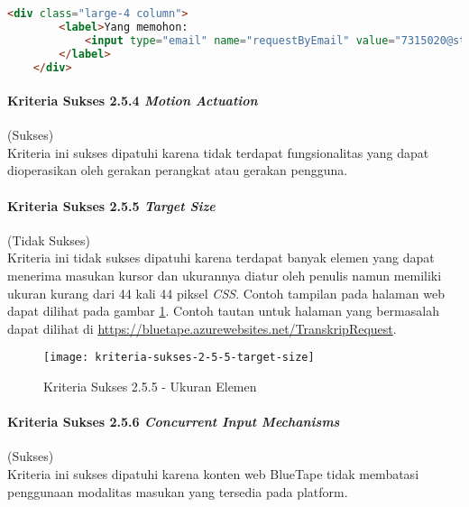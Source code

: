 \begin{lstlisting}[frame=single, label={lst:2.5.3_teks_label_pada_nama}, language=HTML, caption=Kriteria Sukses 2.5.3 - Teks Label pada Atribut Nama]
    <div class="large-4 column">
        <label>Yang memohon:
            <input type="email" name="requestByEmail" value="7315020@student.unpar.ac.id" readonly="readonly"/>
        </label>
    </div>
\end{lstlisting}

\paragraph{Kriteria Sukses 2.5.4 \textit{Motion Actuation}}
\label{par:kepatuhan_bluetape_kriteria_sukses_2.5.4}
(Sukses)\\

Kriteria ini sukses dipatuhi karena tidak terdapat fungsionalitas yang dapat dioperasikan oleh gerakan perangkat atau gerakan pengguna.

\paragraph{Kriteria Sukses 2.5.5 \textit{Target Size}}
\label{par:kepatuhan_bluetape_kriteria_sukses_2.5.5}
(Tidak Sukses)\\

Kriteria ini tidak sukses dipatuhi karena terdapat banyak elemen yang dapat menerima masukan kursor dan ukurannya diatur oleh penulis namun memiliki ukuran kurang dari 44 kali 44 piksel \textit{CSS}. Contoh tampilan pada halaman web dapat dilihat pada gambar \ref{fig:2.5.5_target_size}. Contoh tautan untuk halaman yang bermasalah dapat dilihat di \url{https://bluetape.azurewebsites.net/TranskripRequest}.

\begin{figure}[H]
    \centering  
    \texttt{[image: kriteria-sukses-2-5-5-target-size]}  
    \caption[Kriteria Sukses 2.5.5 - Ukuran Elemen]{Kriteria Sukses 2.5.5 - Ukuran Elemen}
    \label{fig:2.5.5_target_size}  
\end{figure} 

\paragraph{Kriteria Sukses 2.5.6 \textit{Concurrent Input Mechanisms}}
\label{par:kepatuhan_bluetape_kriteria_sukses_2.5.6}
(Sukses)\\

Kriteria ini sukses dipatuhi karena konten web BlueTape tidak membatasi penggunaan modalitas masukan yang tersedia pada platform.

